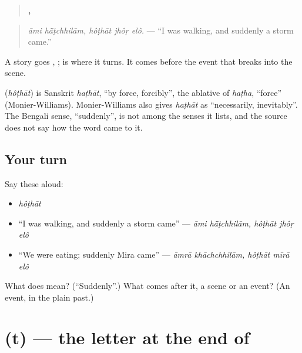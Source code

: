 \begin{quote}
\textbf{ ,   }
\end{quote}

\begin{quote}
\emph{āmi hā̃ṭchhilām, hôṭhāt jhôṛ elô.} — \textquotedblleft{}I was walking, and suddenly a storm came.\textquotedblright{}
\end{quote}

A story goes \textbf{}, \textbf{}; \textbf{} is where it turns. It comes before the event that breaks into the scene.

\begin{cousinweb}
\textbf{} (\emph{hôṭhāt}) is Sanskrit \emph{haṭhāt}, \textquotedblleft{}by force, forcibly\textquotedblright{}, the ablative of \emph{haṭha}, \textquotedblleft{}force\textquotedblright{} (Monier-Williams). Monier-Williams also gives \emph{haṭhāt} as \textquotedblleft{}necessarily, inevitably\textquotedblright{}. The Bengali sense, \textquotedblleft{}suddenly\textquotedblright{}, is not among the senses it lists, and the source does not say how the word came to it.
\end{cousinweb}

\subsection*{Your turn}
Say these aloud:

\begin{itemize}
\raggedright
  \item \emph{hôṭhāt}
  \item \textquotedblleft{}I was walking, and suddenly a storm came\textquotedblright{} — \emph{āmi hā̃ṭchhilām, hôṭhāt jhôṛ elô}
  \item \textquotedblleft{}We were eating; suddenly Mira came\textquotedblright{} — \emph{āmrā khāchchhilām, hôṭhāt mīrā elô}
\end{itemize}

\begin{tcolorbox}[breakable,colback=teal!4,colframe=teal!35!black,title={Before you move on}]
What does \textbf{} mean? (\textquotedblleft{}Suddenly\textquotedblright{}.) What comes after it, a scene or an event? (An event, in the plain past.)
\end{tcolorbox}
\section[\texorpdfstring{\bn{ৎ} (t)}{ৎ (t)}]{ (t) — the letter at the end of }

